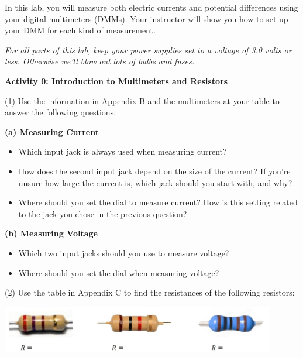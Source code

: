 In this lab, you will measure both electric currents and potential differences using your digital multimeters (DMMs).  Your instructor will show you how to set up your DMM for each kind of measurement.

\begin{newboxed}
\textit{For all parts of this lab, keep your power supplies set to a voltage of 3.0 volts or less.  Otherwise we'll blow out lots of bulbs and fuses.}
\end{newboxed}

\vspace{0.1 in}

\textbf{Activity 0: Introduction to Multimeters and Resistors}

(1) Use the information in Appendix B and the multimeters at your table to answer the following questions.

\textbf{(a) Measuring Current}
\begin{itemize}
	\item Which input jack is always used when measuring current?
	\answerspace{0.5 in}
	\item How does the second input jack depend on the size of the current? If you're unsure how large the current is, which jack should you start with, and why?
\answerspace{1.0 in}
	\item Where should you set the dial to measure current? How is this setting related to the jack you chose in the previous question?
	\answerspace{1.0 in}
\end{itemize}
\newpage
\textbf{(b) Measuring Voltage}
\begin{itemize}
	\item Which two input jacks should you use to measure voltage?
	\answerspace{0.6 in}
	\item Where should you set the dial when measuring voltage?
	\answerspace{0.6 in}
\end{itemize}

(2) Use the table in Appendix C to find the resistances of the following resistors:
\begin{center}
	\includegraphics[width=0.9\textwidth]{electric_circuits2/resistors.jpg}
\end{center}


